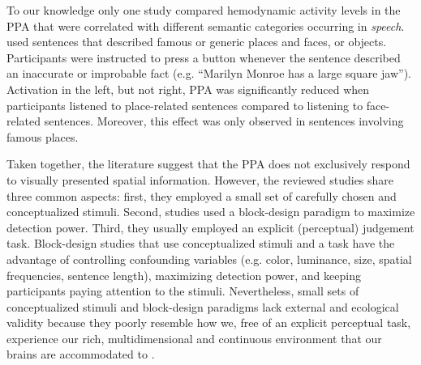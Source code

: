\documentclass[english]{article}
\begin{document}
To our knowledge only one study \citep{aziz2008modulation} compared hemodynamic
activity levels in the PPA that were correlated with different semantic
categories occurring in \textit{speech}.
\cite{aziz2008modulation} used sentences that described famous or generic places
and faces, or objects.
Participants were instructed to press a button whenever the sentence described
an inaccurate or improbable fact (e.g. ``Marilyn Monroe has a large square
jaw'').
Activation in the left, but not right, PPA was significantly reduced when
participants listened to place-related sentences compared to listening to
face-related sentences. Moreover, this effect was only observed in sentences
involving famous places.

Taken together, the literature suggest that the PPA does not exclusively respond to
visually presented spatial information.
However, the reviewed studies share three common aspects:
first, they employed a small set of carefully chosen and conceptualized
stimuli.
Second, studies used a block-design paradigm to maximize detection power.
Third, they usually employed an explicit (perceptual) judgement task.
Block-design studies that use conceptualized stimuli and a task have the
advantage of controlling confounding variables (e.g. color, luminance, size,
spatial frequencies, sentence length), maximizing detection power, and keeping
participants paying attention to the stimuli.
Nevertheless, small sets of conceptualized stimuli and block-design paradigms
lack external and ecological validity \citep{westfall2016fixing,
hasson2004intersubject} because they poorly resemble how we, free of an explicit
perceptual task, experience our rich, multidimensional and continuous
environment that our brains are accommodated to
\citep{sonkusare2019naturalistic}.
\end{document}
